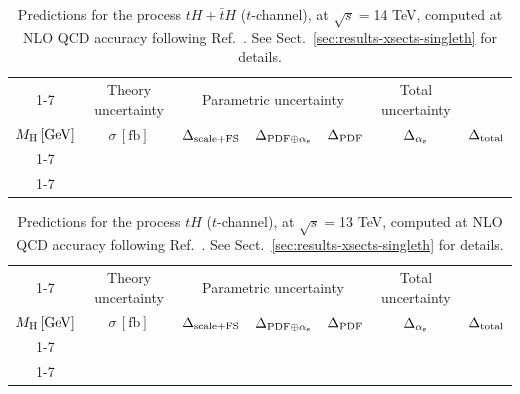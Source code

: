 \begin{table}[ht!]
\caption{\label{tab:th-t-tot14} Predictions for the process $tH + \bar t H$ ($t$-channel), at $\sqrt{s}=$14 TeV, computed at NLO QCD accuracy following Ref.~\cite{Demartin:2015uha}. See Sect.~\ref{sec:results-xsects-singleth} for details.}
\centering
\scriptsize
{\renewcommand{\arraystretch}{1.4}
\begin{tabular}{| cc | c | ccc | c |}
\cline{1-7}
\multicolumn{2}{|c|}{\(\sqrt{s} = 14\,\mathrm{TeV}\)} &
\multicolumn{1}{|c|}{Theory uncertainty} &
\multicolumn{3}{|c|}{Parametric uncertainty} &
\multicolumn{1}{c|}{Total uncertainty} \\
\(M_\mathrm{H}\,[\mathrm{GeV}]\) & \(\sigma\,[\mathrm{fb}]\) &
\(\Delta_{\rm scale+\textrm{FS}}\) &
\(\Delta_{{\rm PDF}\oplus\alpha_{\mathrm{s}}}\) &
{\color{black!55}\(\Delta_{\rm PDF}\)} & {\color{black!55}\(\Delta_{\alpha_{\mathrm{s}}}\)} &
\(\Delta_{\rm total}\)
\\
\cline{1-7}
 \\
\cline{1-7}
\end{tabular}
}
\end{table}
%
\begin{table}[ht!]
\caption{\label{tab:th-t-top13} Predictions for the process $tH$ ($t$-channel), at $\sqrt{s}=$13 TeV, computed at NLO QCD accuracy following Ref.~\cite{Demartin:2015uha}. See Sect.~\ref{sec:results-xsects-singleth} for details.}
\centering
\scriptsize
{\renewcommand{\arraystretch}{1.4}
\begin{tabular}{| cc | c | ccc | c |}
\cline{1-7}
\multicolumn{2}{|c|}{\(\sqrt{s} = 13\,\mathrm{TeV}\)} &
\multicolumn{1}{|c|}{Theory uncertainty} &
\multicolumn{3}{|c|}{Parametric uncertainty} &
\multicolumn{1}{c|}{Total uncertainty} \\
\(M_\mathrm{H}\,[\mathrm{GeV}]\) & \(\sigma\,[\mathrm{fb}]\) &
\(\Delta_{\rm scale+\textrm{FS}}\) &
\(\Delta_{{\rm PDF}\oplus\alpha_{\mathrm{s}}}\) &
{\color{black!55}\(\Delta_{\rm PDF}\)} & {\color{black!55}\(\Delta_{\alpha_{\mathrm{s}}}\)} &
\(\Delta_{\rm total}\)
\\
\cline{1-7}
 \\
\cline{1-7}
\end{tabular}
}
\end{table}

